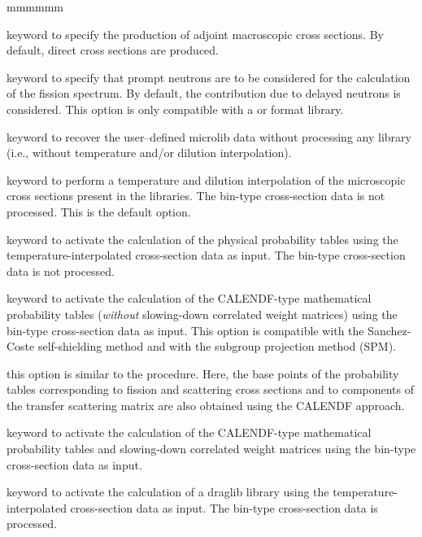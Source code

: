 \begin{ListeDeDescription}{mmmmmm}
\item[\moc{ADJ}] keyword to specify the production of adjoint macroscopic
cross sections. By default, direct cross sections are produced.

\item[\moc{PROM}] keyword to specify that prompt neutrons are to be considered
for the calculation of the fission spectrum. By default, the contribution due to
delayed neutrons is considered. This option is only compatible with a
 or  format library.

\item[\moc{SKIP}] keyword to recover the user--defined microlib data without processing
any library (i.e., without temperature and/or dilution interpolation).

\item[\moc{INTR}] keyword to perform a temperature and dilution interpolation
of the microscopic cross sections present in the libraries. The bin-type
cross-section data is not processed. This is the default option.

\item[\moc{SUBG}] keyword to activate the calculation of the physical probability
tables using the tempera\-tu\-re-interpolated cross-section data as
input.\cite{subg,nse2004} The bin-type cross-section data is not processed.

\item[\moc{PT}] keyword to activate the calculation of the CALENDF-type
mathematical probability tables ({\sl without} slowing-down correlated weight matrices)
using the bin-type cross-section data as input.\cite{pt} This option is
compatible with the Sanchez-Coste self-shielding method and with the subgroup projection method (SPM).\cite{SPM09}

\item[\moc{PTMC}] this option is similar to the  procedure. Here, the base points of the probability tables corresponding
to fission and scattering cross sections and to components of the transfer scattering matrix are also obtained using the CALENDF approach.

\item[\moc{PTSL}] keyword to activate the calculation of the CALENDF-type
mathematical probability tables and slowing-down correlated weight matrices
using the bin-type cross-section data as input.\cite{nse2004}

\item[\moc{NEWL}] keyword to activate the calculation of a {\sc draglib} library
using the temperature-interpo\-la\-ted cross-section data as input. The bin-type
cross-section data is processed.


\end{ListeDeDescription}
